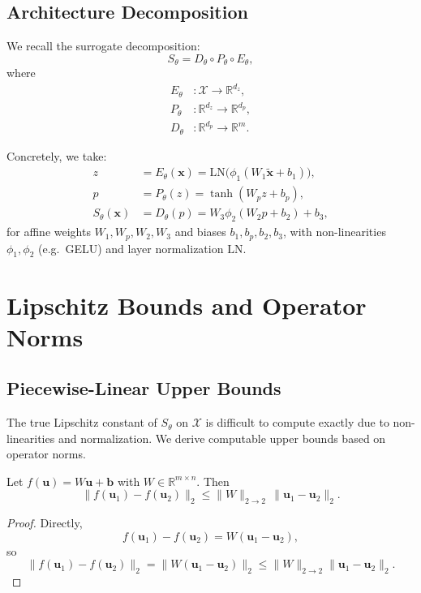 \documentclass[11pt]{article}
\begin{document}
\subsection{Architecture Decomposition}

We recall the surrogate decomposition:
\begin{equation}
  S_\theta = D_\theta \circ P_\theta \circ E_\theta,
\end{equation}
where
\begin{align}
  E_\theta &: \mathcal{X} \to \mathbb{R}^{d_z}, \\
  P_\theta &: \mathbb{R}^{d_z} \to \mathbb{R}^{d_p}, \\
  D_\theta &: \mathbb{R}^{d_p} \to \mathbb{R}^m.
\end{align}

Concretely, we take:
\begin{align}
  z &= E_\theta(\bm{x}) = \mathrm{LN}\big(\phi_1(W_1 \tilde{\bm{x}} + b_1)\big), \\
  p &= P_\theta(z) = \tanh(W_p z + b_p), \\
  S_\theta(\bm{x}) &= D_\theta(p) = W_3 \phi_2(W_2 p + b_2) + b_3,
\end{align}
for affine weights $W_1, W_p, W_2, W_3$ and biases $b_1, b_p, b_2, b_3$, with non-linearities $\phi_1,\phi_2$ (e.g.\ GELU) and layer normalization $\mathrm{LN}$.

\section{Lipschitz Bounds and Operator Norms}

\subsection{Piecewise-Linear Upper Bounds}

The true Lipschitz constant of $S_\theta$ on $\mathcal{X}$ is difficult to compute exactly due to non-linearities and normalization. We derive computable upper bounds based on operator norms.

\begin{lemma}
Let $f(\bm{u}) = W \bm{u} + \bm{b}$ with $W \in \mathbb{R}^{m \times n}$. Then
\[
  \|f(\bm{u}_1) - f(\bm{u}_2)\|_2 \le \|W\|_{2\to 2} \, \|\bm{u}_1 - \bm{u}_2\|_2.
\]
\end{lemma}

\begin{proof}
Directly,
\[
  f(\bm{u}_1) - f(\bm{u}_2) = W(\bm{u}_1 - \bm{u}_2),
\]
so
\[
  \|f(\bm{u}_1) - f(\bm{u}_2)\|_2 = \|W (\bm{u}_1 - \bm{u}_2)\|_2 \le \|W\|_{2\to 2} \|\bm{u}_1 - \bm{u}_2\|_2.
\]
\end{proof}
\end{document}
